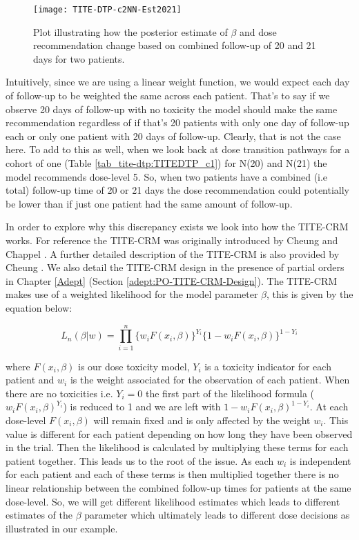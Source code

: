 \begin{figure}[h!]
	\centering
	\caption[Changes in $\beta$ based on combined follow-up of 20 and 21 days for two patients.]{Plot illustrating how the posterior estimate of $\beta$ and dose recommendation change based on combined follow-up of 20 and 21 days for two patients.}
	\label{fig_tite-dtp:c2NNEst2021}
	\texttt{[image: TITE-DTP-c2NN-Est2021]}
\end{figure}

Intuitively, since we are using a linear weight function, we would expect each day of follow-up to be weighted the same across each patient. That's to say if we observe 20 days of follow-up with no toxicity the model should make the same recommendation regardless of if that's 20 patients with only one day of follow-up each or only one patient with 20 days of follow-up. Clearly, that is not the case here. To add to this as well, when we look back at dose transition pathways for a cohort of one (Table \ref{tab_tite-dtp:TITEDTP_c1}) for N(20) and N(21) the model recommends dose-level 5. So, when two patients have a combined (i.e total) follow-up time of 20 or 21 days the dose recommendation could potentially be lower than if just one patient had the same amount of follow-up.   

In order to explore why this discrepancy exists we look into how the TITE-CRM works. For reference the TITE-CRM was originally introduced by Cheung and Chappel \cite{cheungSequentialDesignsPhase2000}. A further detailed description of the TITE-CRM is also provided by Cheung \cite{cheungDoseFindingContinual2011}. We also detail the TITE-CRM design in the presence of partial orders in Chapter \ref{Adept} (Section \ref{adept:PO-TITE-CRM-Design}). The TITE-CRM makes use of a weighted likelihood for the model parameter $\beta$, this is given by the equation below: 

\begin{equation}
	\label{eq_tite-dtp:titelikelihood}
	{L}_n(\beta|w)=\prod_{i=1}^{n}\{w_i F(x_i,\beta)\}^{Y_i} \{1-w_i F(x_i,\beta)\}^{1-Y_i}
\end{equation}

where $F(x_i, \beta)$ is our dose toxicity model, $Y_i$ is a toxicity indicator for each patient and $w_i$ is the weight associated for the observation of each patient. When there are no toxicities i.e. $Y_i = 0$ the first part of the likelihood formula ($w_iF(x_i,\beta)^{Y_i}$) is reduced to 1 and we are left with $1- w_iF(x_i,\beta)^{1-Y_i}$. At each dose-level $F(x_i, \beta)$ will remain fixed and is only affected by the weight $w_i$. This value is different for each patient depending on how long they have been observed in the trial. Then the likelihood is calculated by multiplying these terms for each patient together. This leads us to the root of the issue. As each $w_i$ is independent for each patient and each of these terms is then multiplied together there is no linear relationship between the combined follow-up times for patients at the same dose-level. So, we will get different likelihood estimates which leads to different estimates of the $\beta$ parameter which ultimately leads to different dose decisions as illustrated in our example. 

